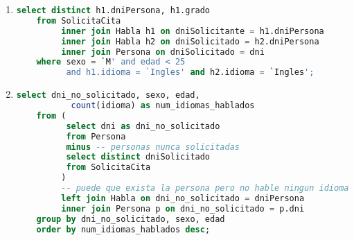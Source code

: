 \begin{enumerate}
	\item 
	\begin{lstlisting}[language=sql]
	select distinct h1.dniPersona, h1.grado
	from SolicitaCita
		 inner join Habla h1 on dniSolicitante = h1.dniPersona
		 inner join Habla h2 on dniSolicitado = h2.dniPersona
		 inner join Persona on dniSolicitado = dni
	where sexo = `M' and edad < 25 
		  and h1.idioma = `Ingles' and h2.idioma = `Ingles';\end{lstlisting}
	
	\item
	\begin{lstlisting}[language=sql]
	select dni_no_solicitado, sexo, edad, 
		   count(idioma) as num_idiomas_hablados
	from ( 
		  select dni as dni_no_solicitado
		  from Persona
		  minus -- personas nunca solicitadas
		  select distinct dniSolicitado
		  from SolicitaCita
		 )
		 -- puede que exista la persona pero no hable ningun idioma
		 left join Habla on dni_no_solicitado = dniPersona
		 inner join Persona p on dni_no_solicitado = p.dni
	group by dni_no_solicitado, sexo, edad
	order by num_idiomas_hablados desc;\end{lstlisting}
\end{enumerate}
